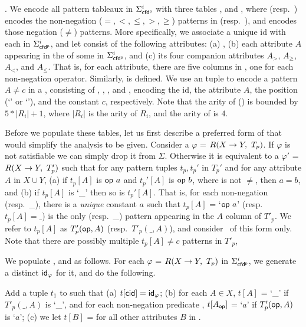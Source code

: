 . We encode all  pattern tableaux
in $\Sigma_{{\mathsf{cfd^p}}}^i$ with three tables ,  and \Enc{\ne}, where
 (resp.~) encodes the non-negation ($=,<,
\le, >, \ge$) patterns in \LHS (resp.~\RHS),
and
\Enc{\ne} encodes those negation ($\ne$) patterns.
More specifically, we associate a unique id  with each
\pCFDs in $\Sigma_{{\mathsf{cfd^p}}}^i$, and let
 consist of the following
attributes: (a) , (b)
each attribute $A$ appearing in the \LHS of some \pCFDs in $\Sigma_{{\mathsf{cfd^p}}}^i$, and
 (c) its four companion attributes $A_{>}$, $A_{\ge}$, $A_{<}$, and
 $A_{\le}$. That is, for each attribute, there are five columns in
 , one for each non-negation operator.
Similarly,  is defined. We use an \Enc{\ne} tuple to encode a
pattern $A \ne c$ in a \pCFD, consisting of , ,
, and , encoding the \pCFD id, the attribute $A$,
the position (`\LHS' or `\RHS'), and the constant $c$, respectively.
Note that the arity of  () is bounded by $5*|R_i|+1$,
where $|R_i|$ is the arity of $R_i$, and the arity of \Enc{\ne} is
$4$.

Before we populate these tables, let us first describe a preferred
form of \pCFDs that would simplify the analysis to be given.
Consider a \pCFD $\varphi$ = $R(X\rightarrow Y,\ T_p)$. If $\varphi$ is not
satisfiable we can simply drop it from $\Sigma$. Otherwise it is
equivalent to a \pCFD $\varphi'$ = $R(X\rightarrow Y,\ T_p')$ such that for
any pattern tuples $t_p, t_p'$ in $T_p'$ and for any attribute $A$
in $X\cup Y$, (a) if $t_p[A]$ is $\op a$ and $t_p'[A]$ is $\op b$,
where \op is not $\ne$, then $a=b$, and (b) if $t_p[A]$ is `\_' then so
is $t_p'[A]$. That is, for each non-negation \op (resp.~\_), there
is a {\em unique} constant $a$ such that $t_p[A]$ = `$\op a$'
(resp.~$t_p[A]=\_$) is the only \op (resp.~\_) pattern appearing in
the $A$ column of $T'_p$. We refer to $t_p[A]$ as $T'_p({\mathsf{op}},A)$
(resp.~$T'_p(\_,A)$), and consider \kwlog~\pCFDs of this form only.
Note that there are possibly multiple $t_p[A] \ne c$ patterns in
$T'_p$,

We populate ,  and \Enc{\ne}  as follows. For each
\pCFD $\varphi$ = $R(X\rightarrow Y,\ T_p)$ in $\Sigma_{{\mathsf{cfd^p}}}^i$,
we generate a distinct  ${\mathsf{id}}_\varphi$ for it, and do the following.
\bi
\item[(1)] Add a tuple $t_1$ to  such that
(a) $t[\protect\mathsf{cid}] = {\mathsf{id}}_\varphi$; (b) for each $A\in X$,
$t[A]$ = `\_' if $T'_p(\_,A)$ is `\_', and for each non-negation
predicate \op, $t[A_{{\mathsf{op}}}]$ = `$a$' if $T'_p({\mathsf{op}},A)$
is `\op $a$'; (c) we let $t[B]$ =  for all other attributes $B$
in .



